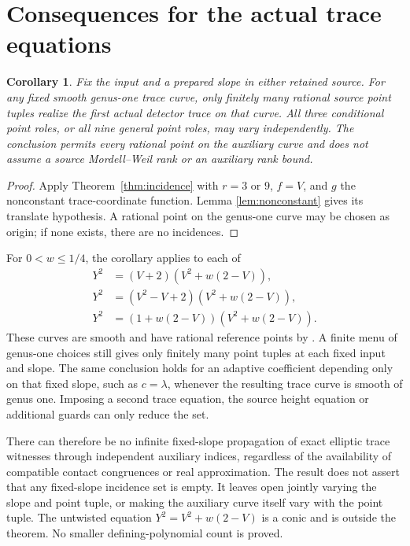 \documentclass[11pt,a4paper]{article}
\newtheorem{corollary}[theorem]{Corollary}
\begin{document}
\section{Consequences for the actual trace equations}

\begin{corollary}\label{cor:actual}
Fix the input and a prepared slope in either retained source.
For any fixed smooth genus-one trace curve, only finitely many
rational source point tuples realize the first actual detector
trace on that curve. All three conditional point roles, or all nine
general point roles, may vary independently. The conclusion permits
every rational point on the auxiliary curve and does not assume a
source Mordell--Weil rank or an auxiliary rank bound.
\end{corollary}
\begin{proof}
Apply Theorem~\ref{thm:incidence} with $r=3$ or $9$, $f=V$,
and $g$ the nonconstant trace-coordinate function. Lemma
\ref{lem:nonconstant} gives its translate hypothesis. A rational
point on the genus-one curve may be chosen as origin; if none
exists, there are no incidences.
\end{proof}

For $0<w\le1/4$, the corollary applies to each of
\[
\begin{aligned}
 Y^2&=(V+2)(V^2+w(2-V)),\\
 Y^2&=(V^2-V+2)(V^2+w(2-V)),\\
 Y^2&=(1+w(2-V))(V^2+w(2-V)).
\end{aligned}
\]
These curves are smooth and have rational reference points by
\cite{SmallClasses}. A finite menu of genus-one choices still
gives only finitely many point tuples at each fixed input and slope.
The same conclusion holds for an adaptive coefficient depending
only on that fixed slope, such as $c=\lambda$, whenever the
resulting trace curve is smooth of genus one. Imposing a second
trace equation, the source height equation or additional guards
can only reduce the set.

There can therefore be no infinite fixed-slope propagation of exact
elliptic trace witnesses through independent auxiliary indices,
regardless of the availability of compatible contact congruences or
real approximation. The result does not assert that any fixed-slope
incidence set is empty. It leaves open jointly varying the slope and
point tuple, or making the auxiliary curve itself vary with the point
tuple. The untwisted equation $Y^2=V^2+w(2-V)$ is a conic and is
outside the theorem. No smaller defining-polynomial count is proved.
\end{document}
